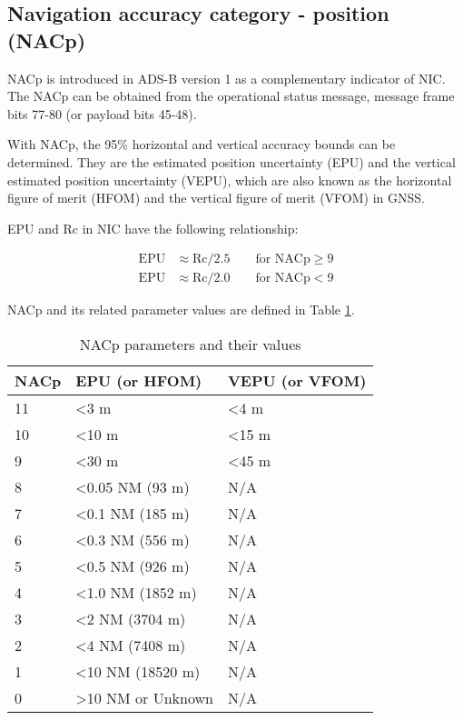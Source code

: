 \subsection{Navigation accuracy category - position (NACp)}

NACp is introduced in ADS-B version 1 as a complementary indicator of NIC. The NACp can be obtained from the operational status message, message frame bits 77-80 (or payload bits 45-48).

With NACp, the 95\% horizontal and vertical accuracy bounds can be determined. They are the estimated position uncertainty (EPU) and the vertical estimated position uncertainty (VEPU), which are also known as the horizontal figure of merit (HFOM) and the vertical figure of merit (VFOM) in GNSS. 

EPU and Rc in NIC have the following relationship:

\begin{equation}
  \begin{split}
    \mathrm{EPU} &\approx \mathrm{Rc} / 2.5   \qquad  \text{for NACp} \ge 9 \\
    \mathrm{EPU} &\approx \mathrm{Rc} / 2.0  \qquad  \text{for NACp} < 9
  \end{split}
\end{equation}

NACp and its related parameter values are defined in Table \ref{tb:nacp-params}.

\begin{table}[]
\caption{NACp parameters and their values}
\label{tb:nacp-params}
\begin{tabular}{|l|l|l|}
\hline
\textbf{NACp} & \textbf{EPU (or HFOM)} & \textbf{VEPU (or VFOM)} \\ \hline \hline
11 & \textless 3 m & \textless 4 m \\ \hline
10 & \textless 10 m & \textless 15 m \\ \hline
9 & \textless 30 m & \textless 45 m \\ \hline
8 & \textless 0.05 NM (93 m) & N/A \\ \hline
7 & \textless 0.1 NM (185 m) & N/A \\ \hline
6 & \textless 0.3 NM (556 m) & N/A \\ \hline
5 & \textless 0.5 NM (926 m) & N/A \\ \hline
4 & \textless 1.0 NM (1852 m) & N/A \\ \hline
3 & \textless 2 NM (3704 m) & N/A \\ \hline
2 & \textless 4 NM (7408 m) & N/A \\ \hline
1 & \textless 10 NM (18520 m) & N/A \\ \hline
0 & \textgreater 10 NM or Unknown & N/A \\ \hline
\end{tabular}
\end{table}



